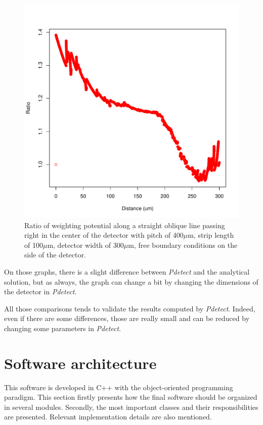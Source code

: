 \documentclass[11pt]{article}
\begin{document}
\begin{figure}[H]
		\begin{minipage}[b]{.46\linewidth}
			\center
			\includegraphics[scale=0.5]{images/annexe/oblique_ratio.pdf}
			\caption{Ratio of weighting potential along a straight oblique line passing right in the
					center of the detector with pitch
					of 400$\mu$m, strip length of 100$\mu$m, detector width of 300$\mu$m, free boundary conditions
					on the side of the detector.}
			\label{fig:oblique_ratio}
		\end{minipage}
	\end{figure}

	On those graphs, there is a slight difference between \textit{Pdetect} and the analytical
	solution, but as always, the graph can change a bit by changing the dimensions of the detector in
	\textit{Pdetect}.

	All those comparisons tends to validate the results computed by \textit{Pdetect}. Indeed, even
	if there are some differences, those are really small and can be reduced by changing some parameters
	in \textit{Pdetect}.

\section{Software architecture} \label{App:soft_arch}

	This software is developed in C++ with the object-oriented programming paradigm.
	This section firstly presents how the final software should be organized in several
	modules. Secondly, the most important classes and their responsibilities are
	presented. Relevant implementation details are also mentioned.
\end{document}
